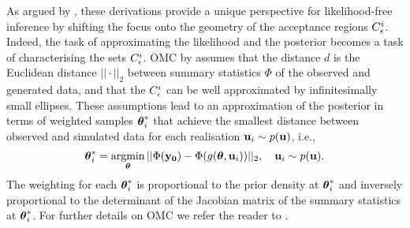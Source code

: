 As argued by \citet{Ikonomov2019}, these derivations provide a unique
perspective for likelihood-free inference by shifting the focus onto
the geometry of the acceptance regions \(C^i_{\epsilon}\). Indeed, the
task of approximating the likelihood and the posterior becomes a task
of characterising the sets \(C^i_{\epsilon}\). OMC by \citet{Meeds2015}
assumes that the distance \(d\) is the Euclidean distance
\(||\cdot||_2\) between summary statistics \(\Phi\) of the observed
and generated data, and that the \(C^i_{\epsilon}\) can be well
approximated by infinitesimally small ellipses. These assumptions lead
to an approximation of the posterior in terms of weighted samples
\(\boldsymbol{\theta}_i^*\) that achieve the smallest distance between observed
and simulated data for each realisation \(\mathbf{u}_i \sim p(\mathbf{u})\), i.e.,\
\begin{equation} \label{eq:omc_opt_prob}
\boldsymbol{\theta}_i^* = \operatorname*{argmin}_{\boldsymbol{\theta}} ||\Phi(\mathbf{y_0})-\Phi(g(\boldsymbol{\theta}, \mathbf{u}_i))||_2  , \quad \mathbf{u}_i \sim p(\mathbf{u}).
\end{equation}
The weighting for each \(\boldsymbol{\theta}_i^*\) is proportional to the prior
density at \(\boldsymbol{\theta}_i^*\) and inversely proportional to the determinant
of the Jacobian matrix of the summary statistics at \(\boldsymbol{\theta}_i^*\). For
further details on OMC we refer the reader to \citep{Meeds2015,
  Ikonomov2019}.

